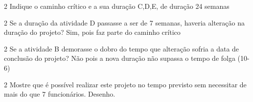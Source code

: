 \documentclass[\mainfilename]{subfiles}
\begin{document}
\begin{questionBox}
\begin{questionBox}
\begin{center}
        \end{center}
    \end{questionBox}

    \begin{questionBox}2{ %
        Indique o caminho crítico e a sua duração
    } %
        C,D,E, de duração 24 semanas
    \end{questionBox}

    \begin{questionBox}2{ %
        Se a duração da atividade D passasse a ser de 7 semanas, haveria alteração na duração do projeto?
    } %
        Sim, pois faz parte do caminho crítico
    \end{questionBox}

    \begin{questionBox}2{ %
        Se a atividade B demorasse o dobro do tempo que alteração sofria a data de conclusão do projeto?
    } %
        Não pois a nova duração não supassa o tempo de folga (10-6)
    \end{questionBox}

    \begin{questionBox}2{ %
        Mostre que é possível realizar este projeto no tempo previsto sem necessitar de mais do que 7 funcionários.
    } %
        Desenho.
    \end{questionBox}
\end{questionBox}
\end{document}
